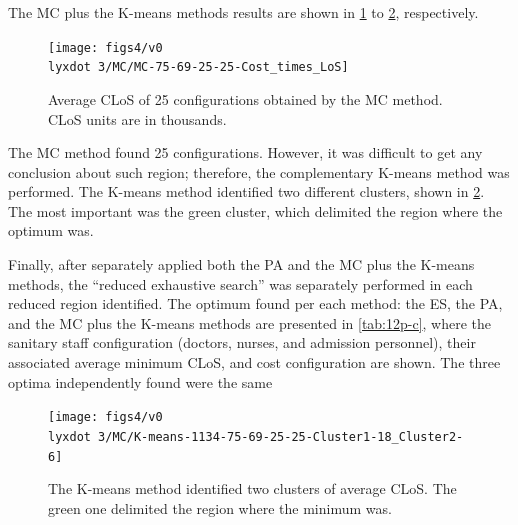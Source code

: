 \documentclass[11pt]{article} %
\begin{document}
The MC plus the K-means methods results are shown in \ref{subfig:mc12-3}
to \ref{subfig:km12-3}, respectively.
\begin{figure}[H]
\centering{}\texttt{[image: figs4/v0\\lyxdot 3/MC/MC-75-69-25-25-Cost\_times\_LoS]}\caption{Average CLoS of 25 configurations obtained by the MC method. CLoS
units are in thousands. \label{subfig:mc12-3}}
\end{figure}
The MC method found 25 configurations. However, it was difficult to
get any conclusion about such region; therefore, the complementary
K-means method was performed. The K-means method identified two different
clusters, shown in \ref{subfig:km12-3}. The most important was the
green cluster, which delimited the region where the optimum was.%

Finally, after separately applied both the PA and the MC plus the
K-means methods, the \textquotedblleft{}reduced exhaustive search\textquotedblright{}
was separately performed in each reduced region identified. The optimum
found per each method: the ES, the PA, and the MC plus the K-means
methods are presented in \ref{tab:12p-c}, where the sanitary staff
configuration (doctors, nurses, and admission personnel), their associated
average minimum CLoS, and cost configuration are shown. The three
optima independently found were the same
\begin{figure}[H]
\begin{centering}
\texttt{[image: figs4/v0\\lyxdot 3/MC/K-means-1134-75-69-25-25-Cluster1-18\_Cluster2-6]}
\par\end{centering}

\caption{The K-means method identified two clusters of average CLoS. The green
one delimited the region where the minimum was. \label{subfig:km12-3}}
\end{figure}
\end{document}
